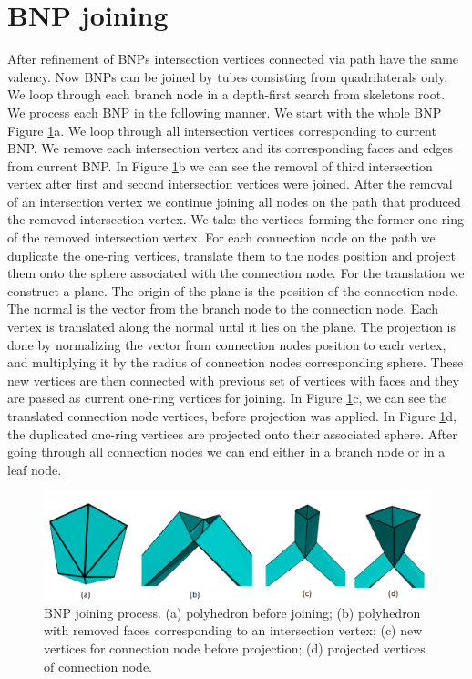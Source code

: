 \section{BNP joining}\label{sec:bnp_join}
After refinement of BNPs intersection vertices connected via path have the same valency. Now BNPs can be joined by tubes consisting from quadrilaterals only. We loop through each branch node in a depth-first search from skeletons root. We process each BNP in the following manner. We start with the whole BNP Figure \ref{fig:joining_process_ilu}a. We loop through all intersection vertices corresponding to current BNP. We remove each intersection vertex and its corresponding faces and edges from current BNP. In Figure \ref{fig:joining_process_ilu}b we can see the removal of third intersection vertex after first and second intersection vertices were joined. After the removal of an intersection vertex we continue joining all nodes on the path that produced the removed intersection vertex. We take the vertices forming the former one-ring of the removed intersection vertex. For each connection node on the path we duplicate the one-ring vertices, translate them to the nodes position and project them onto the sphere associated with the connection node. For the translation we construct a plane. The origin of the plane is the position of the connection node. The normal is the vector from the branch node to the connection node. Each vertex is translated along the normal until it lies on the plane. The projection is done by normalizing the vector from connection nodes position to each vertex, and multiplying it by the radius of connection nodes corresponding sphere. These new vertices are then connected with previous set of vertices with faces and they are passed as current one-ring vertices for joining. In Figure \ref{fig:joining_process_ilu}c, we can see the translated connection node vertices, before projection was applied. In Figure \ref{fig:joining_process_ilu}d, the duplicated one-ring vertices are projected onto their associated sphere. After going through all connection nodes we can end either in a branch node or in a leaf node.

\begin{figure}[h]
    \centering
    \includegraphics[width=\textwidth]{images/joining_ilu.png}
    \caption[BNP joining process]{BNP joining process. (a) polyhedron before joining; (b) polyhedron with removed faces corresponding to an intersection vertex; (c) new vertices for connection node before projection; (d) projected vertices of connection node.}
    \label{fig:joining_process_ilu}
\end{figure}

